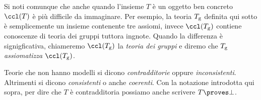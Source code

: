 Si noti comunque che anche quando l'insieme $T$ \`e un oggetto ben concreto $\ccl(T)$ \`e pi\`u difficile da immaginare. Per esempio, la teoria $T_{\rm g}$ definita qui sotto \`e semplicemente un insieme contenente tre assiomi, invece $\ccl(T_{\rm g})$ contiene conoscenze di teoria dei gruppi tuttora ingnote. Quando la differenza \`e signigficativa, chiameremo $\ccl(T_{\rm g})$ la \textit{teoria dei gruppi\/} e diremo che $T_{\rm g}$ \textit{assiomatizza\/} $\ccl(T_{\rm g})$.  

Teorie che non hanno modelli si dicono \emph{contradditorie\/} oppure \emph{inconsistenti}. Altrimenti si dicono \emph{consistenti} o anche \emph{coerenti}. Con la notazione introdotta qui sopra, per dire che $T$ \`e contradditoria possiamo anche scrivere \emph{$T\proves\bot$}.


\begin{comment}
Lasciamo al lettore verificare il seguente fatto. Questo afferma che $\ccl$ soddisfa alle propriet\`a che generalmente ci si aspetta da un buon operatore di chiusura.
\begin{remark}
Per ogni coppia di teorie $T$ ed $S$ valgono le seguenti:
\begin{itemize}
\item[1.] $T\subseteq\ccl(T)$;
\item[2.] $\ccl(T)\;=\;\ccl\big(\ccl(T)\big)$;
\item[3.] $T\subseteq S\ \ \IMP\ \ \ccl(T)\subseteq\ccl(S)$.
\item[4.] $\ccl(T)\ \ =\ \ \bigcup\big\{\ccl(S)\ :\ S \textrm{ sottoinsieme finito di } T\big\}$.
\end{itemize}
La verifica delle prime tre propriet\`a \`e immediata. Invece \ssf{4} richiede richiede l'uso del teorema di compattezza. Quest'ultima propiet\`a mostra che questo operatore di chiusura \`e di \textit{natura finita\/}, o ha un \textit{carattere finito}.\QED
\end{remark}
\end{comment}

